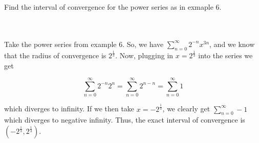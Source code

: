 Find the interval of convergence for the power series as in exmaple 6.\\\\

\begin{solution}\renewcommand{\qedsymbol}{}\ \\
    Take the power series from example 6. So, we have $\sum_{n=0}^{\infty} 2^{-n}x^{3n}$, and we know
    that the radius of convergence is $2^{\frac13}$. Now, plugging in $x=2^{\frac13}$ into the series we
    get
    
    $$\sum_{n=0}^{\infty} 2^{-n}2^{n}=\sum_{n=0}^{\infty} 2^{n-n}=\sum_{n=0}^{\infty} 1$$
    
    which diverges to infinity. If we then take $x=-2^{\frac13}$, we clearly get $\sum_{n=0}^{\infty}-1$
    which diverges to negative infinity. Thus, the exact interval of convergence is
    $(-2^{\frac13},2^{\frac13})$.

\end{solution}